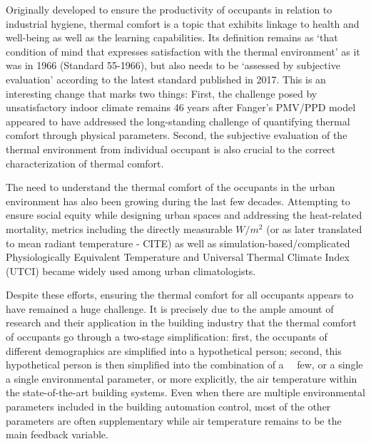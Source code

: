 Originally developed to ensure the productivity of occupants in relation to industrial hygiene\cite{bedford_globe_1934}, thermal comfort is a topic that exhibits linkage to health and well-being as well as the learning capabilities. Its definition remains as `that condition of mind that expresses satisfaction with the thermal environment' as it was in 1966 (Standard 55-1966), but also needs to be `assessed by subjective evaluation' \cite{ansi/ashrae_standard_2017} according to the latest standard published in 2017. This is an interesting change that marks two things: First, the challenge posed by unsatisfactory indoor climate remains 46 years after Fanger's PMV/PPD model appeared to have addressed the long-standing challenge of quantifying thermal comfort through physical parameters\cite{fanger_assessment_1973}. Second, the subjective evaluation of the thermal environment from individual occupant is also crucial to the correct characterization of thermal comfort.

The need to understand the thermal comfort of the occupants in the urban environment has also been growing during the last few decades. Attempting to ensure social equity while designing urban spaces and addressing the heat-related mortality, metrics including the directly measurable $W/m^2$ (or as later translated to mean radiant temperature - CITE) as well as simulation-based/complicated Physiologically Equivalent Temperature\cite{h._hoppe_new_1992} and Universal Thermal Climate Index (UTCI) became widely used among urban climatologists\cite{hoppe_different_2002}.

Despite these efforts, ensuring the thermal comfort for all occupants appears to have remained a huge challenge. It is precisely due to the ample amount of research and their application in the building industry that the thermal comfort of occupants go through a two-stage simplification: first, the occupants of different demographics are simplified into a hypothetical person; second, this hypothetical person is then simplified into the combination of a 　few, or a single a single environmental parameter, or more explicitly, the air temperature within the state-of-the-art building systems. Even when there are multiple environmental parameters included in the building automation control, most of the other parameters are often supplementary while air temperature remains to be the main feedback variable. 


